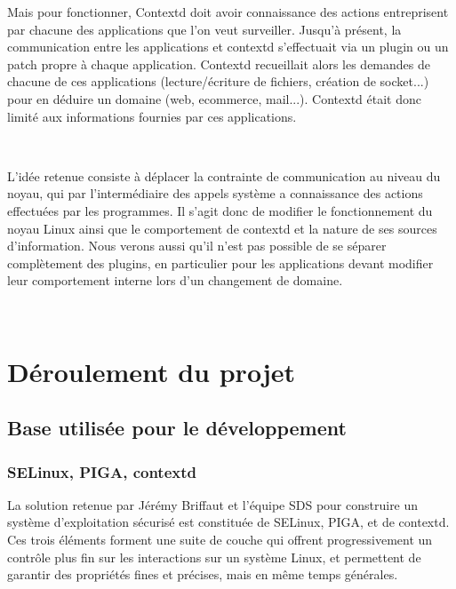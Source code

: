 \documentclass[pdftex,a4paper,titlepage,11pt]{article}
\begin{document}
Mais pour fonctionner, Contextd doit avoir connaissance des actions entreprisent par chacune des applications que l'on veut surveiller. Jusqu'à présent, la communication entre les applications et contextd s'effectuait via un plugin ou un patch propre à chaque application. Contextd recueillait alors les demandes de chacune de ces applications (lecture/écriture de fichiers, création de socket...) pour en déduire un domaine (web, ecommerce, mail...). Contextd était donc limité aux informations fournies par ces applications.

~

L'idée retenue consiste à déplacer la contrainte de communication au niveau du noyau, qui par l'intermédiaire des appels système a connaissance des actions effectuées par les programmes. Il s'agit donc de modifier le fonctionnement du noyau Linux ainsi que le comportement de contextd et la nature de ses sources d'information. Nous verons aussi qu'il n'est pas possible de se séparer complètement des plugins, en particulier pour les applications devant modifier leur comportement interne lors d'un changement de domaine.

~

\newpage



\newpage

\section{Déroulement du projet}

\subsection{Base utilisée pour le développement}


\subsubsection{SELinux, PIGA, contextd}

La solution retenue par Jérémy Briffaut et l'équipe SDS pour construire un système d'exploitation sécurisé est constituée de SELinux, PIGA, et de contextd. Ces trois éléments forment une suite de couche qui offrent progressivement un contrôle plus fin sur les interactions sur un système Linux, et permettent de garantir des propriétés fines et précises, mais en même temps générales.
\end{document}
